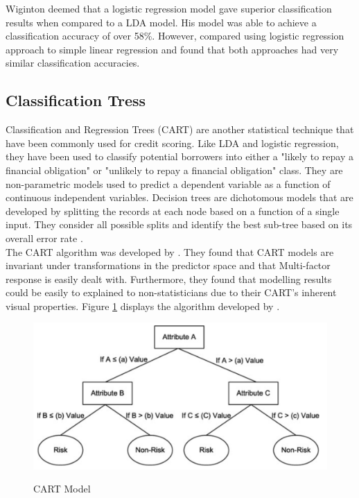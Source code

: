 \vspace{15pt}

Wiginton deemed that a logistic regression model gave superior classification results when compared to a LDA model. His model was able to achieve a classification accuracy of over 58\%. However, \textcite{LogRegHand} compared using logistic regression approach to simple linear regression and found that both approaches had very similar classification accuracies. 

\subsection{Classification Tress}

Classification and Regression Trees (CART) are another statistical technique that have been commonly used for credit scoring. Like LDA and logistic regression, they have been used to classify potential borrowers into either a "likely to repay a financial obligation" or "unlikely to repay a financial obligation" class. They are non-parametric models used to predict a dependent variable as a function of continuous independent variables. Decision trees are dichotomous models that are developed by splitting the records at each node based on a function of a single input. They consider all possible splits and identify the best sub-tree based on its overall error rate \parencite{DecTreesZekic}. \\

The CART algorithm was developed by \textcite{DecTreesBrieman}. They found that CART models are invariant under transformations in the predictor space and that Multi-factor response is easily dealt with. Furthermore, they found that modelling results could be easily to explained to non-statisticians due to their CART's inherent visual properties. Figure \ref{fig:CART} displays the algorithm developed by \textcite{DecTreesBrieman}. 

\vspace{15pt}

\begin{figure}[!htb]
\centering
\includegraphics[width = \textwidth]{images/CART.png}
\caption{CART Model}
\parencite{DecTreesBrieman}
\label{fig:CART}
\end{figure}

